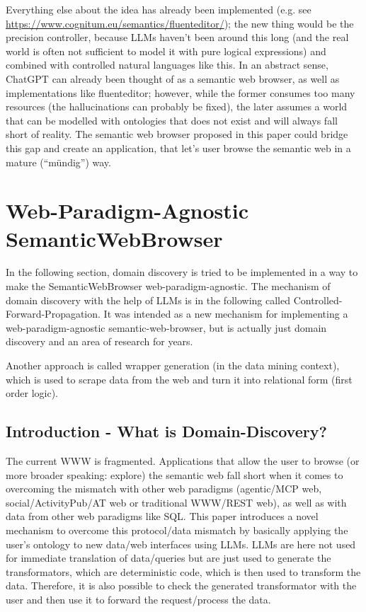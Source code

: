 \documentclass[12pt,a4paper]{article}
\begin{document}
Everything else about the idea has already been implemented (e.g. see \url{https://www.cognitum.eu/semantics/fluenteditor/}); the new thing would be the precision controller, because LLMs haven't been around this long (and the real world is often not sufficient to model it with pure logical expressions) and combined with controlled natural languages like this. In an abstract sense, ChatGPT can already been thought of as a semantic web browser, as well as implementations like fluenteditor; however, while the former consumes too many resources (the hallucinations can probably be fixed), the later assumes a world that can be modelled with ontologies that does not exist and will always fall short of reality. The semantic web browser proposed in this paper could bridge this gap and create an application, that let's user browse the semantic web in a mature (``mündig'') way.

\newpage

\section{Web-Paradigm-Agnostic SemanticWebBrowser}

In the following section, domain discovery is tried to be implemented in a way to make the SemanticWebBrowser web-paradigm-agnostic.
The mechanism of domain discovery with the help of LLMs is in the following called Controlled-Forward-Propagation.
It was intended as a new mechanism for implementing a web-paradigm-agnostic semantic-web-browser, but is actually just domain discovery and an area of research for years.

Another approach is called wrapper generation (in the data mining context), which is used to scrape data from the web and turn it into relational form (first order logic).

\subsection{Introduction - What is Domain-Discovery?}

The current WWW is fragmented. Applications that allow the user to browse (or more broader speaking: explore) the semantic web fall short when it comes to overcoming the mismatch with other web paradigms (agentic/MCP web, social/ActivityPub/AT web or traditional WWW/REST web), as well as with data from other web paradigms like SQL. This paper introduces a novel mechanism to overcome this protocol/data mismatch by basically applying the user's ontology to new data/web interfaces using LLMs. LLMs are here not used for immediate translation of data/queries but are just used to generate the transformators, which are deterministic code, which is then used to transform the data. Therefore, it is also possible to check the generated transformator with the user and then use it to forward the request/process the data.
\end{document}
